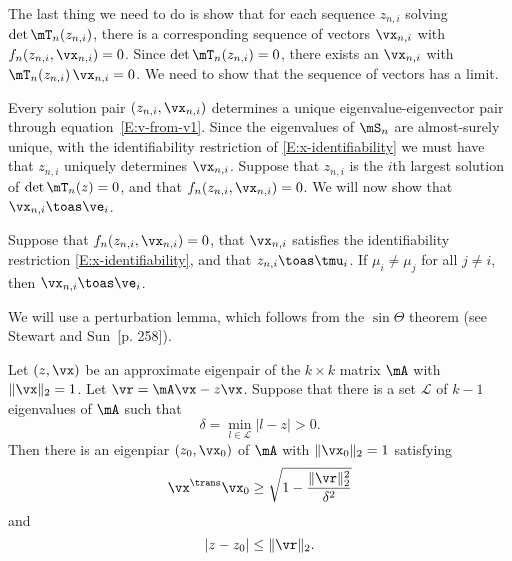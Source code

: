 The last thing we need to do is show that for each sequence
$z_{n,i}$ solving $\det \mT_n(z_{n,i})$, there is a corresponding sequence
of vectors $\vx_{n,i}$ with $f_n(z_{n,i}, \vx_{n,i}) = 0$.  Since $\det \mT_n (z_{n,i}) = 0$, there exists an $\vx_{n,i}$ with 
$\mT_{n} (z_{n,i}) \, \vx_{n,i} = 0$.  We need to show that the sequence of vectors has a limit.

Every solution pair $(z_{n,i}, \vx_{n,i})$ determines a unique
eigenvalue-eigenvector pair through equation~\eqref{E:v-from-v1}.  Since the eigenvalues of $\mS_n$ are almost-surely unique, with
the identifiability restriction of \eqref{E:x-identifiability} we must have that $z_{n,i}$ uniquely determines $\vx_{n,i}$.  Suppose that $z_{n,i}$ is the $i$th largest solution of $\det \mT_n(z) = 0$, and that $f_n( z_{n,i}, \vx_{n,i}) = 0$.  We will now show that $\vx_{n,i} \toas \ve_i$.

\begin{lemma}\label{L:xn-converges}
    Suppose that $f_n(z_{n,i}, \vx_{n,i}) = 0$, that $\vx_{n,i}$ satisfies the 
    identifiability restriction \eqref{E:x-identifiability}, and that
    $z_{n,i} \toas \tmu_i$.
    If $\mu_i \neq \mu_j$ for all $j \neq i$, then $\vx_{n,i} \toas \ve_i$.
\end{lemma}

We will use a perturbation lemma, which follows from the $\sin \Theta$ theorem (see Stewart and Sun~\cite{stewart1990mpt}[p. 258]).

\begin{lemma}\label{L:approx-eigenpair}
    Let $(z,\vx)$ be an approximate eigenpair of the $k\times k$
    matrix $\mA$ with $\| \vx \|_2 = 1$.  Let $\vr = \mA \vx - z \vx$.
    Suppose that there is a set $\mathcal{L}$ of $k-1$ eigenvalues of $\mA$ 
    such that
    \[
        \delta = \min_{l \in \mathcal{L}} | l - z | > 0.
    \]
    Then there is an eigenpiar $(z_0, \vx_0)$ of $\mA$ with 
    $\| \vx_0 \|_2 = 1$ satisfying
    \[
        \vx^\trans \vx_0
            \geq
                \sqrt{ 1 - \frac{\|\vr\|_2^2}{ \delta^2 } }
    \]
    and
    \[
        | z - z_0 |
            \leq \| \vr \|_2.
    \]
\end{lemma}


